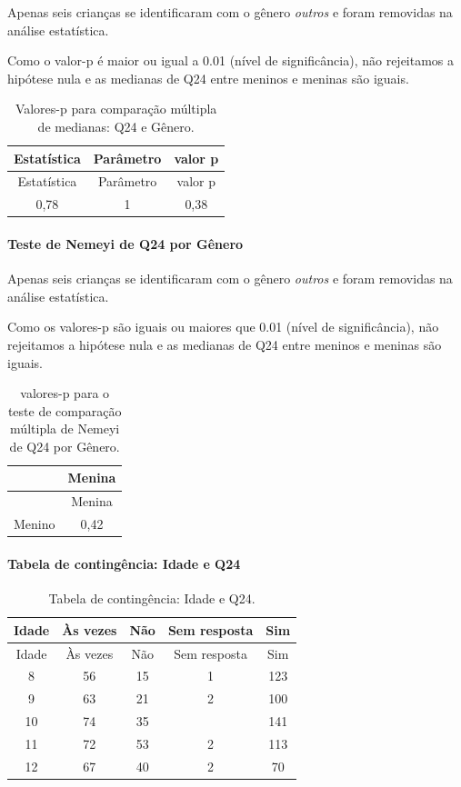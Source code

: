 \documentclass[]{article}
\let\oldparagraph\paragraph
\renewcommand{\paragraph}[1]{\oldparagraph{#1}\mbox{}}
\begin{document}
Apenas seis crianças se identificaram com o gênero \emph{outros} e foram removidas na análise estatística.

Como o valor-p é maior ou igual a 0.01 (nível de significância), não rejeitamos a hipótese nula e as medianas de Q24 entre meninos e meninas são iguais.

\begin{longtable}[]{@{}ccc@{}}
\caption{\label{tab:unnamed-chunk-619}Valores-p para comparação múltipla de medianas: Q24 e Gênero.}\tabularnewline
\toprule
Estatística & Parâmetro & valor p\tabularnewline
\midrule
\endfirsthead
\toprule
Estatística & Parâmetro & valor p\tabularnewline
\midrule
\endhead
0,78 & 1 & 0,38\tabularnewline
\bottomrule
\end{longtable}

\hypertarget{teste-de-nemeyi-de-q24-por-guxeanero}{%
\paragraph{Teste de Nemeyi de Q24 por Gênero}\label{teste-de-nemeyi-de-q24-por-guxeanero}}

Apenas seis crianças se identificaram com o gênero \emph{outros} e foram removidas na análise estatística.

Como os valores-p são iguais ou maiores que 0.01 (nível de significância), não rejeitamos a hipótese nula e as medianas de Q24 entre meninos e meninas são iguais.

\begin{longtable}[]{@{}lc@{}}
\caption{\label{tab:unnamed-chunk-621}valores-p para o teste de comparação múltipla de Nemeyi de Q24 por Gênero.}\tabularnewline
\toprule
& Menina\tabularnewline
\midrule
\endfirsthead
\toprule
& Menina\tabularnewline
\midrule
\endhead
Menino & 0,42\tabularnewline
\bottomrule
\end{longtable}

\cleardoublepage

\hypertarget{tabela-de-continguxeancia-idade-e-q24}{%
\paragraph{Tabela de contingência: Idade e Q24}\label{tabela-de-continguxeancia-idade-e-q24}}

\begin{longtable}[]{@{}ccccc@{}}
\caption{\label{tab:unnamed-chunk-622}Tabela de contingência: Idade e Q24.}\tabularnewline
\toprule
Idade & Às vezes & Não & Sem resposta & Sim\tabularnewline
\midrule
\endfirsthead
\toprule
Idade & Às vezes & Não & Sem resposta & Sim\tabularnewline
\midrule
\endhead
8 & 56 & 15 & 1 & 123\tabularnewline
9 & 63 & 21 & 2 & 100\tabularnewline
10 & 74 & 35 & & 141\tabularnewline
11 & 72 & 53 & 2 & 113\tabularnewline
12 & 67 & 40 & 2 & 70\tabularnewline
\bottomrule
\end{longtable}
\end{document}
